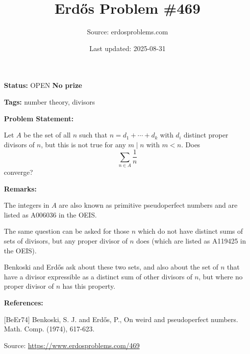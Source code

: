 \documentclass{article}
\title{Erd\H{o}s Problem \#469}
\date{Last updated: 2025-08-31}
\author{Source: erdosproblems.com}
\begin{document}
\maketitle

\noindent\textbf{Status:} OPEN \quad \textbf{No prize}

\noindent\textbf{Tags:} number theory, divisors

\medskip
\noindent\textbf{Problem Statement:}

Let $A$ be the set of all $n$ such that $n=d_1+\cdots+d_k$ with $d_i$ distinct proper divisors of $n$, but this is not true for any $m\mid n$ with $m<n$. Does\[\sum_{n\in A}\frac{1}{n}\]converge?

\bigskip
\noindent\textbf{Remarks:}

The integers in $A$ are also known as primitive pseudoperfect numbers and are listed as A006036 in the OEIS.

The same question can be asked for those $n$ which do not have distinct sums of sets of divisors, but any proper divisor of $n$ does (which are listed as A119425 in the OEIS).

Benkoski and Erd\H{o}s \cite{BeEr74} ask about these two sets, and also about the set of $n$ that have a divisor expressible as a distinct sum of other divisors of $n$, but where no proper divisor of $n$ has this property.

\bigskip
\noindent\textbf{References:}

[BeEr74] Benkoski, S. J. and Erd\H{o}s, P., On weird and pseudoperfect numbers. Math. Comp. (1974), 617-623.

\bigskip
\noindent\small{Source: \url{https://www.erdosproblems.com/469}}
\end{document}
